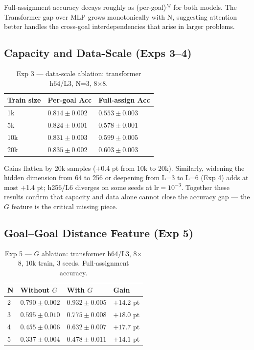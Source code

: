 \documentclass[11pt,a4paper]{article}
\begin{document}
Full-assignment accuracy decays roughly as (per-goal)$^M$ for both models. The Transformer
gap over MLP grows monotonically with N, suggesting attention better handles the cross-goal
interdependencies that arise in larger problems.

\subsection{Capacity and Data-Scale (Exps 3--4)}

\begin{table}[htbp]
\centering
\caption{Exp 3 --- data-scale ablation: transformer h64/L3, N=3, 8$\times$8.}
\begin{tabularx}{\textwidth}{lXX}
\toprule
\textbf{Train size} & \textbf{Per-goal Acc} & \textbf{Full-assign Acc} \\
\midrule
1k  & $0.814 \pm 0.002$ & $0.553 \pm 0.003$ \\
5k  & $0.824 \pm 0.001$ & $0.578 \pm 0.001$ \\
10k & $0.831 \pm 0.003$ & $0.599 \pm 0.005$ \\
20k & $0.835 \pm 0.002$ & $0.603 \pm 0.003$ \\
\bottomrule
\end{tabularx}
\label{tab:datascale}
\end{table}

Gains flatten by 20k samples ($+$0.4 pt from 10k to 20k). Similarly, widening the hidden
dimension from 64 to 256 or deepening from L=3 to L=6 (Exp 4) adds at most $+$1.4 pt; h256/L6
diverges on some seeds at lr$=10^{-3}$. Together these results confirm that capacity and data
alone cannot close the accuracy gap --- the $G$ feature is the critical missing piece.

\subsection{Goal--Goal Distance Feature (Exp 5)}

\begin{table}[htbp]
\centering
\caption{Exp 5 --- $G$ ablation: transformer h64/L3, 8$\times$8, 10k train, 3 seeds.
Full-assignment accuracy.}
\begin{tabularx}{\textwidth}{lXXX}
\toprule
\textbf{N} & \textbf{Without $G$} & \textbf{With $G$} & \textbf{Gain} \\
\midrule
2 & $0.790 \pm 0.002$ & $0.932 \pm 0.005$ & $+14.2$ pt \\
3 & $0.595 \pm 0.010$ & $0.775 \pm 0.008$ & $+18.0$ pt \\
4 & $0.455 \pm 0.006$ & $0.632 \pm 0.007$ & $+17.7$ pt \\
5 & $0.337 \pm 0.004$ & $0.478 \pm 0.011$ & $+14.1$ pt \\
\bottomrule
\end{tabularx}
\label{tab:ablation}
\end{table}
\end{document}
